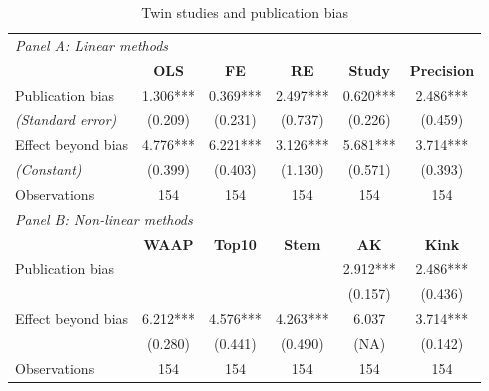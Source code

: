 \begin{table}[!htbp]
  \centering
  \small
  \singlespace
  \caption{Twin studies and publication bias}
  \label{tab:PB-Twins}
  \begin{tabular}{
      @{\hskip\tabcolsep\extracolsep}
      l*{5}{c}} %
    \toprule
    \multicolumn{6}{l}{\textit{Panel A: Linear methods}}                                            \\
    \multicolumn{1}{c}{}                  &
    \textbf{OLS}                          &
    \textbf{FE}                           &
    \textbf{RE}                           &
    \textbf{Study}                        &
    \textbf{Precision}                                                                              \\
    \midrule

    Publication bias                      & 1.306*** & 0.369*** & 2.497*** & 0.620*** & 2.486***    \\
    \emph{\hspace{0.2cm}(Standard error)} & (0.209)  & (0.231)  & (0.737)  & (0.226)  & (0.459)     \\
    \addlinespace[0.5em]
    Effect beyond bias                    & 4.776*** & 6.221*** & 3.126*** & 5.681*** & 3.714***    \\
    \emph{\hspace{0.2cm}(Constant)}       & (0.399)  & (0.403)  & (1.130)  & (0.571)  & (0.393)     \\
    \addlinespace[0.5em]
    Observations                          & 154      & 154      & 154      & 154      & 154         \\


    \midrule

    \multicolumn{6}{l}{\textit{Panel B: Non-linear methods}}                                        \\
                                          &
    \textbf{WAAP}                         &
    \textbf{Top10}                        &
    \textbf{Stem}                         &
    \textbf{AK}                           &
    \textbf{Kink}                                                                                   \\
    \midrule
    Publication bias                      &          &          &          & 2.912*** & 2.486***    \\
                                          &          &          &          & (0.157)  & (0.436)     \\
    \addlinespace[0.5em]
    Effect beyond bias                    & 6.212*** & 4.576*** & 4.263*** & 6.037    & 3.714***    \\
                                          & (0.280)  & (0.441)  & (0.490)  & (NA)     & (0.142)     \\
    \addlinespace[0.5em]
    Observations                          & 154      & 154      & 154      & 154      & 154         \\


\end{tabular}
\end{table}
